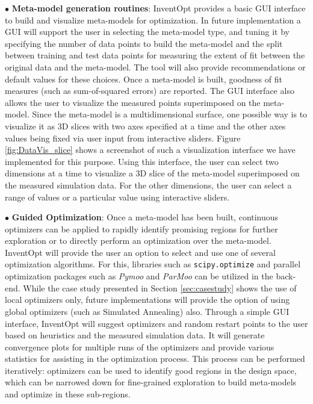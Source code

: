      \vspace{0.2em}\noindent $\bullet$ \textbf{Meta-model generation routines}: InventOpt provides a basic GUI interface to build and visualize meta-models for optimization. In future implementation a GUI will support the user in selecting the meta-model type, and tuning it by specifying the number of data points to build the meta-model and the split between training and test data points for measuring the extent of fit between the original data and the meta-model. The tool will also provide recommendations or default values for these choices. Once a meta-model is built, goodness of fit measures (such as sum-of-squared errors) are reported.  
     The GUI interface also allows the user to visualize the measured points superimposed on the meta-model. Since the meta-model is a multidimensional surface, one possible way is to visualize it as 3D slices with two axes specified at a time and the other axes values being fixed via user input from interactive sliders. Figure \ref{fig:DataVis_slice} shows a screenshot of such a visualization interface we have implemented for this purpose. Using this interface, the user can select two dimensions at a time to visualize a 3D slice of the meta-model superimposed on the measured simulation data. For the other dimensions, the user can select a range of values or a particular value using interactive sliders.
               
     \vspace{0.2em}\noindent $\bullet$ \textbf{Guided Optimization}: Once a meta-model has been built, continuous optimizers can be applied to rapidly identify promising regions for further exploration or to directly perform an optimization over the meta-model. InventOpt will provide the user an option to select and use one of several optimization algorithms. 
     For this, libraries such as \texttt{scipy.optimize} and parallel optimization packages such as \textit{Pymoo} \cite{pymoo} and \textit{ParMoo} \cite{chang_2022} can be utilized in the back-end. 
     While the case study presented in Section \ref{sec:casestudy} shows the use of local optimizers only, future implementations will provide the option of using global optimizers (such as Simulated Annealing) also. Through a simple GUI interface, InventOpt will suggest optimizers and random restart points to the user based on heuristics and the measured simulation data. It will generate convergence plots for multiple runs of the optimizers and provide various statistics for assisting in the optimization process. This process can be performed iteratively: optimizers can be used to identify good regions in the design space, which can be narrowed down for fine-grained exploration to build meta-models and optimize in these sub-regions. 
      
